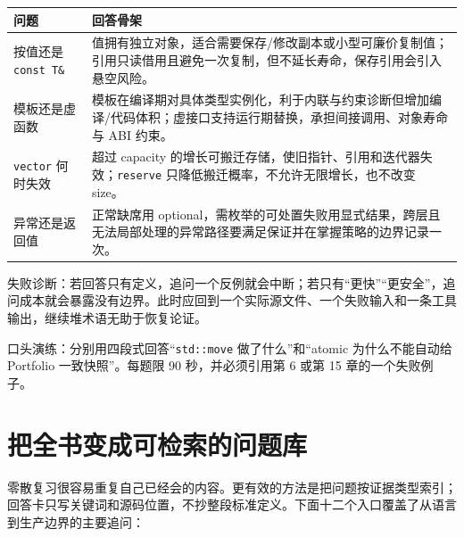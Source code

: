 \begin{center}
\begin{tabularx}{\textwidth}{@{}p{}X@{}}
\toprule
问题 & 回答骨架 \\
\midrule
按值还是 \texttt{const T\&} & 值拥有独立对象，适合需要保存/修改副本或小型可廉价复制值；引用只读借用且避免一次复制，但不延长寿命，保存引用会引入悬空风险。 \\
模板还是虚函数 & 模板在编译期对具体类型实例化，利于内联与约束诊断但增加编译/代码体积；虚接口支持运行期替换，承担间接调用、对象寿命与 ABI 约束。 \\
\texttt{vector} 何时失效 & 超过 capacity 的增长可搬迁存储，使旧指针、引用和迭代器失效；\texttt{reserve} 只降低搬迁概率，不允许无限增长，也不改变 size。 \\
异常还是返回值 & 正常缺席用 optional，需枚举的可处置失败用显式结果，跨层且无法局部处理的异常路径要满足保证并在掌握策略的边界记录一次。 \\
\bottomrule
\end{tabularx}
\end{center}

失败诊断：若回答只有定义，追问一个反例就会中断；若只有“更快”“更安全”，追问成本就会暴露没有边界。此时应回到一个实际源文件、一个失败输入和一条工具输出，继续堆术语无助于恢复论证。

口头演练：分别用四段式回答“\texttt{std::move} 做了什么”和“atomic 为什么不能自动给 Portfolio 一致快照”。每题限 90 秒，并必须引用第 6 或第 15 章的一个失败例子。

\section{把全书变成可检索的问题库}

零散复习很容易重复自己已经会的内容。更有效的方法是把问题按证据类型索引；回答卡只写关键词和源码位置，不抄整段标准定义。下面十二个入口覆盖了从语言到生产边界的主要追问：

